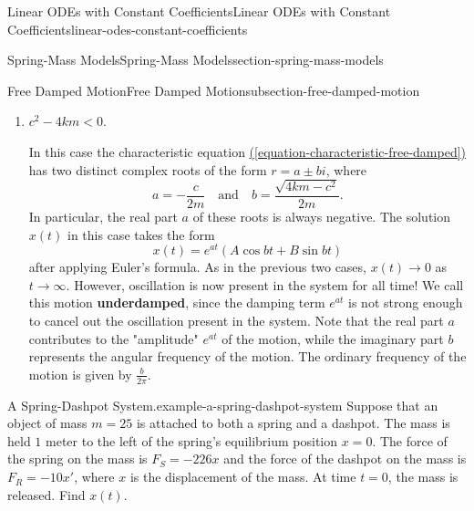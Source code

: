 \documentclass[oneside,10pt,]{book}
\newcommand{\terminology}[1]{\textbf{#1}}
\numberwithin{equation}{section}
\newcommand{\lt}{<}
\begin{document}
\begin{chapterptx}{Linear ODEs with Constant Coefficients}{}{Linear ODEs with Constant Coefficients}{}{}{linear-odes-constant-coefficients}
\begin{sectionptx}{Spring-Mass Models}{}{Spring-Mass Models}{}{}{section-spring-mass-models}
\begin{subsectionptx}{Free Damped Motion}{}{Free Damped Motion}{}{}{subsection-free-damped-motion}
\begin{enumerate}[label=\arabic*:]
\(c^{2} - 4km = 0\).%
\par
\hypertarget{p-215}{}%
In this case, the characteristic equation \hyperref[equation-characteristic-free-damped]{(\ref{equation-characteristic-free-damped})} has a repeated (real) root, and so the solution \(x(t)\) takes the form%
\begin{equation*}
x(t) = e^{r_{1}t}(c_{1} + c_{2}t).
\end{equation*}
This mass can pass through \(x = 0\) only once, at \(t = -\frac{c_{1}}{c_{2}}\). Once it does, the mass will "turn around" soon afterwards and beginning moving back to \(0\), as in the first case. We call this type of motion \terminology{critically damped}, since it's right on the border between overdamped motion and oscillating motion.%
\item\hypertarget{li-19}{}\hypertarget{p-216}{}%
\(c^{2} - 4km \lt 0\).%
\par
\hypertarget{p-217}{}%
In this case the characteristic equation \hyperref[equation-characteristic-free-damped]{(\ref{equation-characteristic-free-damped})} has two distinct complex roots of the form \(r = a \pm bi\), where%
\begin{equation*}
a = -\frac{c}{2m}\quad\text{and}\quad b = \frac{\sqrt{4km - c^{2}}}{2m}.
\end{equation*}
In particular, the real part \(a\) of these roots is always negative. The solution \(x(t)\) in this case takes the form%
\begin{equation*}
x(t) = e^{at}(A\cos bt + B\sin bt)
\end{equation*}
after applying Euler's formula. As in the previous two cases, \(x(t)\to0\) as \(t\to\infty\). However, oscillation is now present in the system for all time! We call this motion \terminology{underdamped}, since the damping term \(e^{at}\) is not strong enough to cancel out the oscillation present in the system. Note that the real part \(a\) contributes to the "amplitude" \(e^{at}\) of the motion, while the imaginary part \(b\) represents the angular frequency of the motion. The ordinary frequency of the motion is given by \(\frac{b}{2\pi}\).%
\end{enumerate}
\begin{example}{A Spring-Dashpot System.}{example-a-spring-dashpot-system}%
\hypertarget{p-218}{}%
Suppose that an object of mass \(m = 25\) is attached to both a spring and a dashpot. The mass is held \(1\) meter to the left of the spring's equilibrium position \(x = 0\). The force of the spring on the mass is \(F_{S} = -226x\) and the force of the dashpot on the mass is \(F_{R} = -10x'\), where \(x\) is the displacement of the mass. At time \(t = 0\), the mass is released. Find \(x(t)\).%

\end{example}
\end{subsectionptx}
\end{sectionptx}
\end{chapterptx}
\end{document}
